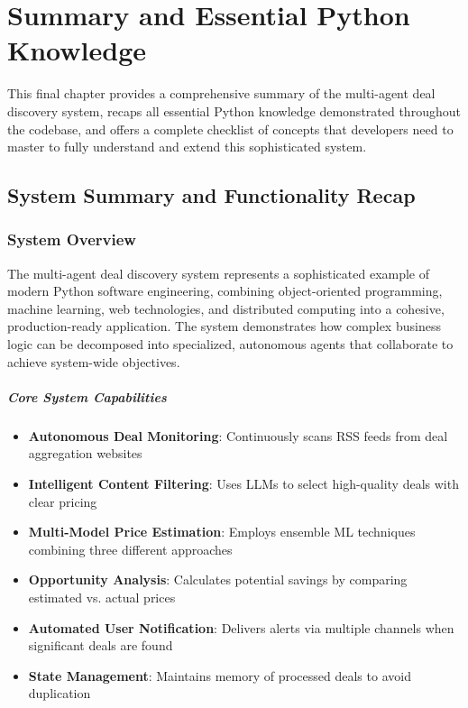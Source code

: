 \chapter{Summary and Essential Python Knowledge}

This final chapter provides a comprehensive summary of the multi-agent deal discovery system, recaps all essential Python knowledge demonstrated throughout the codebase, and offers a complete checklist of concepts that developers need to master to fully understand and extend this sophisticated system.

\section{System Summary and Functionality Recap}

\subsection{System Overview}

The multi-agent deal discovery system represents a sophisticated example of modern Python software engineering, combining object-oriented programming, machine learning, web technologies, and distributed computing into a cohesive, production-ready application. The system demonstrates how complex business logic can be decomposed into specialized, autonomous agents that collaborate to achieve system-wide objectives.

\paragraph{Core System Capabilities}
\begin{itemize}
\item \textbf{Autonomous Deal Monitoring}: Continuously scans RSS feeds from deal aggregation websites
\item \textbf{Intelligent Content Filtering}: Uses LLMs to select high-quality deals with clear pricing
\item \textbf{Multi-Model Price Estimation}: Employs ensemble ML techniques combining three different approaches
\item \textbf{Opportunity Analysis}: Calculates potential savings by comparing estimated vs. actual prices
\item \textbf{Automated User Notification}: Delivers alerts via multiple channels when significant deals are found
\item \textbf{State Management}: Maintains memory of processed deals to avoid duplication
\end{itemize}

